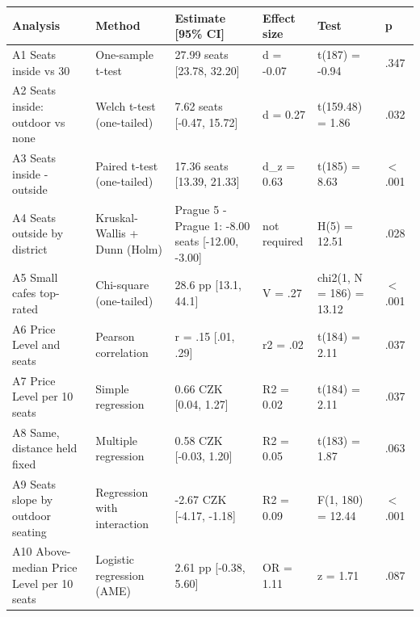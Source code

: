 \begin{tabular}{P{2.6cm}P{2.5cm}P{3.3cm}lP{2.3cm}l}
  \toprule
Analysis & Method & Estimate [95\% CI] & Effect size & Test & p \\ 
  \midrule
A1 Seats inside vs 30 & One-sample t-test & 27.99 seats [23.78, 32.20] & d = -0.07 & t(187) = -0.94 & .347 \\ 
  A2 Seats inside: outdoor vs none & Welch t-test (one-tailed) & 7.62 seats [-0.47, 15.72] & d = 0.27 & t(159.48) = 1.86 & .032 \\ 
  A3 Seats inside - outside & Paired t-test (one-tailed) & 17.36 seats [13.39, 21.33] & d\_z = 0.63 & t(185) = 8.63 & $<$ .001 \\ 
  A4 Seats outside by district & Kruskal-Wallis + Dunn (Holm) & Prague 5 - Prague 1: -8.00 seats [-12.00, -3.00] & not required & H(5) = 12.51 & .028 \\ 
  A5 Small cafes top-rated & Chi-square (one-tailed) & 28.6 pp [13.1, 44.1] & V = .27 & chi2(1, N = 186) = 13.12 & $<$ .001 \\ 
  A6 Price Level and seats & Pearson correlation & r = .15 [.01, .29] & r2 = .02 & t(184) = 2.11 & .037 \\ 
  A7 Price Level per 10 seats & Simple regression & 0.66 CZK [0.04, 1.27] & R2 = 0.02 & t(184) = 2.11 & .037 \\ 
  A8 Same, distance held fixed & Multiple regression & 0.58 CZK [-0.03, 1.20] & R2 = 0.05 & t(183) = 1.87 & .063 \\ 
  A9 Seats slope by outdoor seating & Regression with interaction & -2.67 CZK [-4.17, -1.18] & R2 = 0.09 & F(1, 180) = 12.44 & $<$ .001 \\ 
  A10 Above-median Price Level per 10 seats & Logistic regression (AME) & 2.61 pp [-0.38, 5.60] & OR = 1.11 & z = 1.71 & .087 \\ 
   \bottomrule
\end{tabular}
